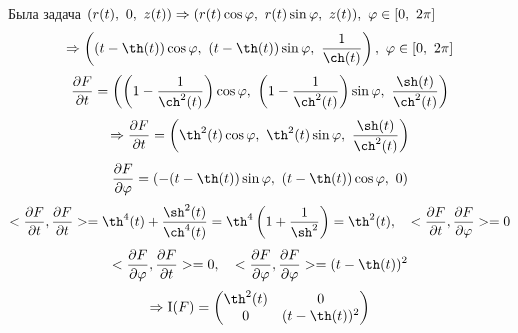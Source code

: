 \documentclass[main]{subfiles}
\begin{document}
    \begin{sol}
      Была задача $ (r(t),\ 0,\ z(t)) \Ra (r(t) \cos \varphi,\ r(t)\sin \varphi,\ z(t)),\ \varphi \in [0,\ 2\pi]$\\
      \[\Ra \Br{
        \Br{t - \th(t)}\cos \varphi,\
        \Br{t - \th(t)}\sin \varphi,\
        \dfrac{1}{\ch(t)}},\
      \varphi \in [0,\ 2\pi]\]
      \[\frac{\d F}{\d t} = \Br{
        \Br{1 - \frac{1}{\ch^2(t)}}\cos \varphi,\
        \Br{1 - \frac{1}{\ch^2(t)}}\sin \varphi,\
        \frac{\sh(t)}{\ch^2(t)}
      }\]
      \[\Ra \frac{\d F}{\d t} = \Br{
        \th^2 (t)\cos \varphi,\
        \th^2 (t)\sin \varphi,\
        \frac{\sh(t)}{\ch^2(t)}
      }\]
      \[\frac{\d F}{\d \varphi} = \Br{
        -(t-\th(t))\sin \varphi,\
        (t-\th(t))\cos \varphi,\
        0
      }\]
      \[<\frac{\d F}{\d t}, \frac{\d F}{\d t}> = \th^4 (t)+\frac{\sh^2 (t)}{\ch^4 (t)} = \th^4 \Br{1+\dfrac{1}{\sh^2}} =\th^2 (t),\q
      <\frac{\d F}{\d t}, \frac{\d F}{\d \varphi}> = 0\]
      \[<\frac{\d F}{\d \varphi}, \frac{\d F}{\d t}> = 0,\q
      <\frac{\d F}{\d \varphi}, \frac{\d F}{\d \varphi}> = (t-\th(t))^2 \]
      \[\Ra \RNumb{1}(F) =
      \begin{pmatrix}
        {}\th^2 (t) & 0\\
        0 & (t-\th(t))^2
      \end{pmatrix}\]


\end{sol}
\end{document}
